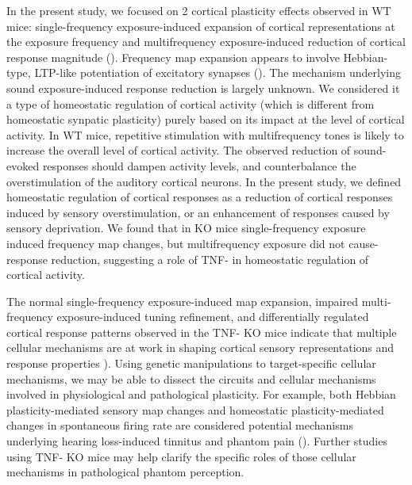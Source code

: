 In the present study, we focused on 2 cortical plasticity effects observed in WT mice: single-frequency exposure-induced expansion of cortical representations at the exposure frequency and multifrequency exposure-induced reduction of cortical response magnitude (\cite{Condon1991, Zhang2001, Pienkowski2012}). Frequency map expansion appears to involve Hebbian-type, LTP-like potentiation of excitatory synapses (\cite{Froemke2007, Sun2010}). The mechanism underlying sound exposure-induced response reduction is largely unknown. We considered it a type of homeostatic regulation of cortical activity (which is different from homeostatic synpatic plasticity) purely based on its impact at the level of cortical activity. In WT mice, repetitive stimulation with multifrequency tones is likely to increase the overall level of cortical activity. The observed reduction of sound-evoked responses should dampen activity levels, and counterbalance the overstimulation of the auditory cortical neurons. In the present study, we defined homeostatic regulation of cortical responses as a reduction of cortical responses induced by sensory overstimulation, or an enhancement of responses caused by sensory deprivation. We found that in KO mice single-frequency exposure induced frequency map changes, but multifrequency exposure did not cause-response reduction, suggesting a role of TNF-\textalpha{} in homeostatic regulation of cortical activity.

The normal single-frequency exposure-induced map expansion, impaired multi-frequency exposure-induced tuning refinement, and differentially regulated cortical response patterns observed in the TNF-\textalpha{} KO mice indicate that multiple cellular mechanisms are at work in shaping cortical sensory representations and response properties \cite{Bear2003, Bear2003, Burrone2003, Turrigiano2004, Dan2006, Liu2007, Wu2008, Feldman2009}). Using genetic manipulations to target-specific cellular mechanisms, we may be able to dissect the circuits and cellular mechanisms involved in physiological and pathological plasticity. For example, both Hebbian plasticity-mediated sensory map changes and homeostatic plasticity-mediated changes in spontaneous firing rate are considered potential mechanisms underlying hearing loss-induced tinnitus and phantom pain (\cite{Eggermont2006, Yang2011}). Further studies using TNF-\textalpha{} KO mice may help clarify the specific roles of those cellular mechanisms in pathological phantom perception.

\printbibliography